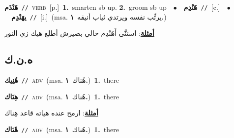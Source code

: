 \documentclass[10pt,a4paper,twoside]{article} %
\begin{document}
\begin{multicols}{2}
{\setlength\topsep{0pt}\textbf{\foreignlanguage{arabic}{هَنْدَم}}\ {\color{gray}\texttt{//}\color{black}}\ \textsc{verb}\ [p.]\ \textbf{1.}~smarten sb up.  \textbf{2.}~groom sb up\ \ $\bullet$\ \ \setlength\topsep{0pt}\textbf{\foreignlanguage{arabic}{هَنْدِم}}\ {\color{gray}\texttt{//}\color{black}}\ [c.]\ \ $\bullet$\ \ \setlength\topsep{0pt}\textbf{\foreignlanguage{arabic}{يهَنْدِم}}\ {\color{gray}\texttt{//}\color{black}}\ [i.]\ \color{gray}(msa. \foreignlanguage{arabic}{يرتِّب نفسه ويرتدي ثياب أنيقه}~\foreignlanguage{arabic}{\textbf{١.}})\color{black}\  \begin{flushright}\color{gray}\foreignlanguage{arabic}{\textbf{\underline{\foreignlanguage{arabic}{أمثلة}}}: استنَّى أَهَنْدِم حالي بصيرش أطلع هيك زي النور}\end{flushright}\color{black}} \vspace{2mm}

\vspace{-3mm}
\subsection*{\color{blue}\foreignlanguage{arabic}{ه.ن.ك}\color{blue}{ (ntws)}} 

{\setlength\topsep{0pt}\textbf{\foreignlanguage{arabic}{هُنِيك}}\ {\color{gray}\texttt{//}\color{black}}\ \textsc{adv}\ \color{gray}(msa. \foreignlanguage{arabic}{هُناك}~\foreignlanguage{arabic}{\textbf{١.}})\color{black}\ \textbf{1.}~there\ } \vspace{2mm}

{\setlength\topsep{0pt}\textbf{\foreignlanguage{arabic}{هِنَاك}}\ {\color{gray}\texttt{//}\color{black}}\ \textsc{adv}\ \color{gray}(msa. \foreignlanguage{arabic}{هُناك}~\foreignlanguage{arabic}{\textbf{١.}})\color{black}\ \textbf{1.}~there\  \begin{flushright}\color{gray}\foreignlanguage{arabic}{\textbf{\underline{\foreignlanguage{arabic}{أمثلة}}}: ارمح عنده هياته قاعد هِناك}\end{flushright}\color{black}} \vspace{2mm}

{\setlength\topsep{0pt}\textbf{\foreignlanguage{arabic}{هْنَاك}}\ {\color{gray}\texttt{//}\color{black}}\ \textsc{adv}\ \color{gray}(msa. \foreignlanguage{arabic}{هُناك}~\foreignlanguage{arabic}{\textbf{١.}})\color{black}\ \textbf{1.}~there\ } \vspace{2mm}


\end{multicols}
\end{document}
